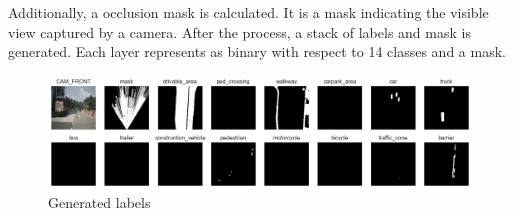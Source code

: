 Additionally, a occlusion mask is calculated. It is a mask indicating the visible view captured by a camera. After the process, a stack of labels and mask is generated. Each layer represents as binary with respect to 14 classes and a mask.

\begin{figure}[h]
  \centering
  \includegraphics[width=1\textwidth]{img/3-binary-gt.png}
  \caption{Generated labels}
  \label{fig:example2}
\end{figure}

  
